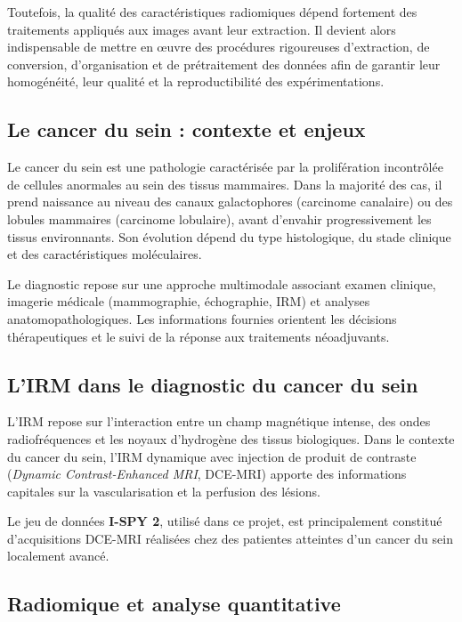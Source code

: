 \documentclass[12pt,a4paper]{report}
\begin{document}
    Toutefois, la qualité des caractéristiques radiomiques dépend fortement des traitements appliqués aux images avant leur extraction. Il devient alors indispensable de mettre en œuvre des procédures rigoureuses d'extraction, de conversion, d'organisation et de prétraitement des données afin de garantir leur homogénéité, leur qualité et la reproductibilité des expérimentations.
    
    \subsection{Le cancer du sein : contexte et enjeux}
    
    Le cancer du sein est une pathologie caractérisée par la prolifération incontrôlée de cellules anormales au sein des tissus mammaires. Dans la majorité des cas, il prend naissance au niveau des canaux galactophores (carcinome canalaire) ou des lobules mammaires (carcinome lobulaire), avant d'envahir progressivement les tissus environnants. Son évolution dépend du type histologique, du stade clinique et des caractéristiques moléculaires.
    
    Le diagnostic repose sur une approche multimodale associant examen clinique, imagerie médicale (mammographie, échographie, IRM) et analyses anatomopathologiques. Les informations fournies orientent les décisions thérapeutiques et le suivi de la réponse aux traitements néoadjuvants.
    
    \subsection{L'IRM dans le diagnostic du cancer du sein}
    
    L'IRM repose sur l'interaction entre un champ magnétique intense, des ondes radiofréquences et les noyaux d'hydrogène des tissus biologiques. Dans le contexte du cancer du sein, l'IRM dynamique avec injection de produit de contraste (\textit{Dynamic Contrast-Enhanced MRI}, DCE-MRI) apporte des informations capitales sur la vascularisation et la perfusion des lésions.
    
    Le jeu de données \textbf{I-SPY 2}, utilisé dans ce projet, est principalement constitué d'acquisitions DCE-MRI réalisées chez des patientes atteintes d'un cancer du sein localement avancé.
    
    \subsection{Radiomique et analyse quantitative}
    
\end{document}
